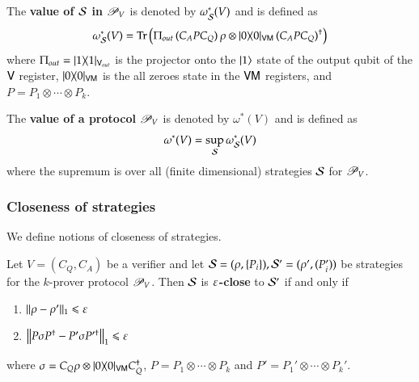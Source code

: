 The \textbf{value of $\mathcal{S}$ in $\mathscr{P}_V$} is denoted by $\omega^*_{\mathcal{S}}(V)$ and is defined as
\[
	\omega^*_{\mathcal{S}}(V) = \operatorname{Tr} \left( \Pi_{out} \, ( C_A P C_Q) \, \rho \otimes |0\rangle\! \langle 0|_{{\mathsf{V}} {\mathsf{M}}} \, (C_A P C_Q)^\dagger\right)
\]
where $\Pi_{out} = |1\rangle\! \langle 1|_{{\mathsf{V}}_{out}}$ is the projector onto the $|1\rangle$ state of the output qubit of the ${\mathsf{V}}$ register, $|0\rangle\! \langle 0|_{{\mathsf{V}} {\mathsf{M}}}$ is the all zeroes state in the ${\mathsf{V}} {\mathsf{M}}$ registers, and $P = P_1 \otimes \cdots \otimes P_k$. 


The \textbf{value of a protocol $\mathscr{P}_V$} is denoted by $\omega^*(V)$ and is defined as 
\[
	\omega^*(V) = \sup_{\mathcal{S}} \omega^*_{\mathcal{S}}(V)
\]
where the supremum is over all (finite dimensional) strategies $\mathcal{S}$ for $\mathscr{P}_V$. 



\subsubsection{Closeness of strategies} 

We define notions of closeness of strategies. 
%

\begin{definition}
	Let $V = (C_Q,C_A)$ be a verifier and let $\mathcal{S} = (\rho,\{P_i\}), \mathcal{S}' = (\rho',(P_i'))$ be strategies for the $k$-prover protocol $\mathscr{P}_V$. Then $\mathcal{S}$ is \textbf{$\varepsilon$-close} to $\mathcal{S}'$ if and only if
	\begin{enumerate}
		\item $ \lVert \rho - \rho'\rVert_1 \leqslant \varepsilon$
		\item $\left\lVert P \sigma P^\dagger - P' \sigma P'^\dagger \right\rVert_1 \leqslant \varepsilon$		
		
	\end{enumerate}
where $\sigma = C_Q \rho \otimes |0\rangle\! \langle 0|_{{\mathsf{V}} {\mathsf{M}}} C_Q^\dagger$, $P = P_1 \otimes \cdots \otimes P_k$ and $P' = P_1' \otimes \cdots \otimes P_k'$.

\end{definition}

